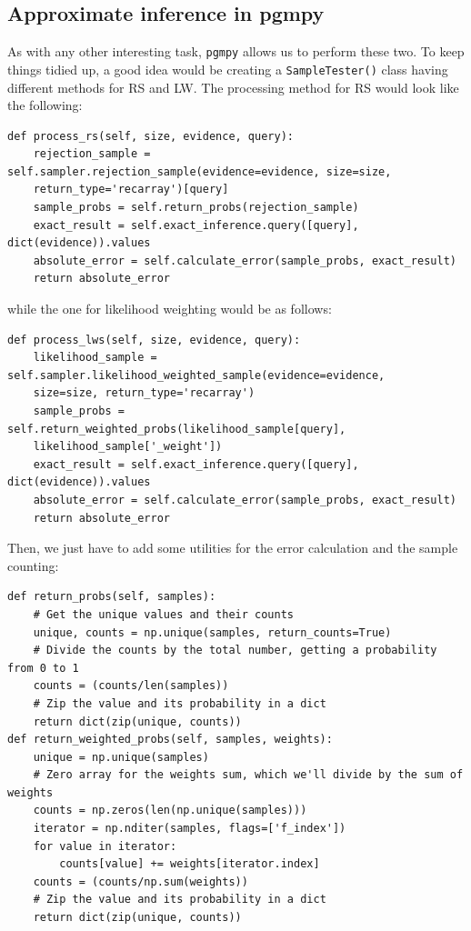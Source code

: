\subsection{Approximate inference in pgmpy}
As with any other interesting task, \texttt{pgmpy} allows us to perform these two. To keep things tidied up, a good idea would be creating a \texttt{SampleTester()} class having different methods for RS and LW. The processing method for RS would look like the following:
\begin{verbatim}
def process_rs(self, size, evidence, query):
    rejection_sample = self.sampler.rejection_sample(evidence=evidence, size=size,
    return_type='recarray')[query]
    sample_probs = self.return_probs(rejection_sample)
    exact_result = self.exact_inference.query([query], dict(evidence)).values
    absolute_error = self.calculate_error(sample_probs, exact_result)
    return absolute_error
\end{verbatim}
while the one for likelihood weighting would be as follows:
\begin{verbatim}
def process_lws(self, size, evidence, query):
    likelihood_sample = self.sampler.likelihood_weighted_sample(evidence=evidence,
    size=size, return_type='recarray')
    sample_probs = self.return_weighted_probs(likelihood_sample[query],
    likelihood_sample['_weight'])
    exact_result = self.exact_inference.query([query], dict(evidence)).values
    absolute_error = self.calculate_error(sample_probs, exact_result)
    return absolute_error
\end{verbatim}
Then, we just have to add some utilities for the error calculation and the sample counting:
\begin{verbatim}
def return_probs(self, samples):
    # Get the unique values and their counts
    unique, counts = np.unique(samples, return_counts=True)
    # Divide the counts by the total number, getting a probability from 0 to 1
    counts = (counts/len(samples))
    # Zip the value and its probability in a dict
    return dict(zip(unique, counts)) 
def return_weighted_probs(self, samples, weights):
    unique = np.unique(samples)
    # Zero array for the weights sum, which we'll divide by the sum of weights
    counts = np.zeros(len(np.unique(samples))) 
    iterator = np.nditer(samples, flags=['f_index'])
    for value in iterator:
        counts[value] += weights[iterator.index]
    counts = (counts/np.sum(weights))
    # Zip the value and its probability in a dict
    return dict(zip(unique, counts)) 
\end{verbatim}
